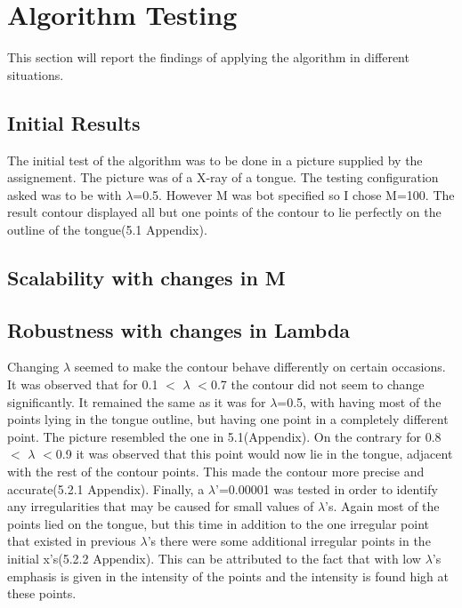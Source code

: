 \documentclass[12pt,a4paper,twocolumn]{article}
\begin{document}
\section{Algorithm Testing}
This section will report the findings of applying the algorithm in different situations.
\subsection{Initial Results}
The initial test of the algorithm was to be done in a picture supplied by the assignement. The picture was of a X-ray of a tongue. The testing configuration asked was to be with $\lambda$=0.5. However M was bot specified so I chose M=100. The result contour displayed all but one points of the contour to lie perfectly on the outline of the tongue(5.1 Appendix).
\subsection{Scalability with changes in M}
\subsection{Robustness with changes in Lambda}
Changing $\lambda$ seemed to make the contour behave differently on certain occasions. 
It was observed that for 0.1 $<$ $\lambda$ $<$0.7 the contour did not seem to change significantly. It remained the same as it was for $\lambda$=0.5, with having most of the points lying in the tongue outline, but having one point in a completely different point. The picture resembled the one in 5.1(Appendix).
On the contrary for 0.8 $<$ $\lambda$ $<$0.9 it was observed that this point would now lie in the tongue, adjacent with the rest of the contour points. This made the contour more precise and accurate(5.2.1 Appendix).
Finally, a $\lambda$'=0.00001 was tested in order to identify any irregularities that may be caused for small values of $\lambda$'s. Again most of the points lied on the tongue, but this time in addition to the one irregular point that existed in previous $\lambda$'s there were some additional irregular points in the initial x's(5.2.2 Appendix). This can be attributed to the fact that with low $\lambda$'s emphasis is given in the intensity of the points and the intensity is found high at these points.
\end{document}
